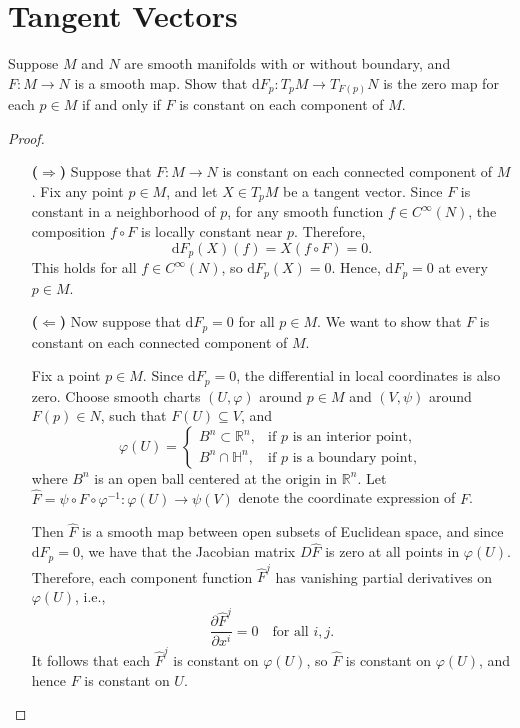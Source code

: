 \chapter{Tangent Vectors}

\begin{problem}
    Suppose $M$ and $N$ are smooth manifolds with or without boundary, and $F \colon M \to N$ is a smooth map. Show that $\mathrm{d}F_p \colon T_pM \to T_{F(p)}N$ is the zero map for each $p \in M$ if and only if $F$ is constant on each component of $M$.
    \begin{proof}
        \begin{itemize}
            \item[\textbf{($\Rightarrow$)}] Suppose that \( F \colon M \to N \) is constant on each connected component of \( M \). Fix any point \( p \in M \), and let \( X \in T_pM \) be a tangent vector. Since \( F \) is constant in a neighborhood of \( p \), for any smooth function \( f \in C^\infty(N) \), the composition \( f \circ F \) is locally constant near \( p \). Therefore,
            \[
            \mathrm{d}F_p(X)(f) = X(f \circ F) = 0.
            \]
            This holds for all \( f \in C^\infty(N) \), so \( \mathrm{d}F_p(X) = 0 \). Hence, \( \mathrm{d}F_p = 0 \) at every \( p \in M \).
            \item[\textbf{($\Leftarrow$)}] Now suppose that \( \mathrm{d}F_p = 0 \) for all \( p \in M \). We want to show that \( F \) is constant on each connected component of \( M \).

            Fix a point \( p \in M \). Since \( \mathrm{d}F_p = 0 \), the differential in local coordinates is also zero. Choose smooth charts \( (U, \varphi) \) around \( p \in M \) and \( (V, \psi) \) around \( F(p) \in N \), such that \( F(U) \subseteq V \), and
            \[
            \varphi(U) = 
            \begin{cases}
            B^n \subset \mathbb{R}^n, & \text{if } p \text{ is an interior point}, \\
            B^n \cap \mathbb{H}^n, & \text{if } p \text{ is a boundary point},
            \end{cases}
            \]
            where \( B^n \) is an open ball centered at the origin in \( \mathbb{R}^n \). Let \( \widehat{F} = \psi \circ F \circ \varphi^{-1} \colon \varphi(U) \to \psi(V) \) denote the coordinate expression of \( F \).

            Then \( \widehat{F} \) is a smooth map between open subsets of Euclidean space, and since \( \mathrm{d}F_p = 0 \), we have that the Jacobian matrix \( D\widehat{F} \) is zero at all points in \( \varphi(U) \). Therefore, each component function \( \widehat{F}^j \) has vanishing partial derivatives on \( \varphi(U) \), i.e.,
            \[
            \frac{\partial \widehat{F}^j}{\partial x^i} = 0 \quad \text{for all } i,j.
            \]
            It follows that each \( \widehat{F}^j \) is constant on \( \varphi(U) \), so \( \widehat{F} \) is constant on \( \varphi(U) \), and hence \( F \) is constant on \( U \).


\end{itemize}
\end{proof}
\end{problem}
